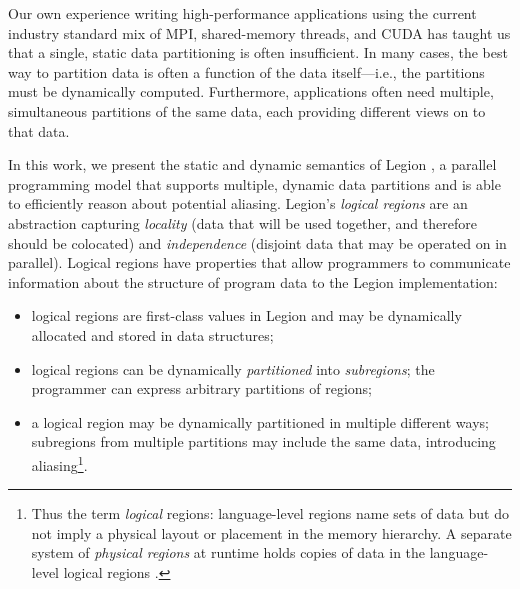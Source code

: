 Our own experience writing high-performance applications
using the current industry standard mix of MPI, shared-memory
threads, and CUDA has taught us that a
single, static data partitioning is often insufficient.  In many cases, the
best way to partition data is often a function of the data
itself---i.e., the partitions must be dynamically computed.
Furthermore, applications often need multiple, simultaneous partitions of
the same data, each providing different views on to that data.  

In this work, we present the static and dynamic semantics of Legion \cite{Legion12},
a parallel programming model that supports multiple, dynamic data partitions and is
able to efficiently reason about potential aliasing.
Legion's {\em logical regions} are an abstraction capturing {\em locality} 
(data that will be used together, and therefore should be colocated) 
and {\em independence} (disjoint data that may be operated on in parallel).  
Logical regions have properties that allow programmers to communicate information
about the structure of program data to the Legion implementation:
\begin{itemize}
\item  logical regions are first-class values in Legion
and may be dynamically allocated and stored in data structures;

\item logical regions can be dynamically {\em partitioned} into {\em subregions}; 
the programmer can express arbitrary partitions of regions;

\item  a logical region may be dynamically partitioned in multiple different ways;
subregions from multiple partitions may include the same data, introducing 
aliasing\footnote{Thus
  the term {\em logical} regions: language-level regions
  name sets of data but do not imply a physical layout or placement in
  the memory hierarchy. A separate system of {\em physical regions} at
  runtime holds copies of data in the language-level logical regions
  \cite{Legion12}.}.

\end{itemize}


